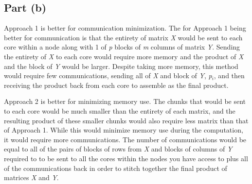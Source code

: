 \documentclass{article}\usepackage[]{graphicx}\usepackage[]{color}
\begin{document}
\subsection{Part (b)}
Approach 1 is better for communication minimization.  The for Approach 1 being better for communication is that the entirety of matrix \emph{X} would be sent to each core within a node along with 1 of \emph{p} blocks of \emph{m} columns of matrix \emph{Y}.  Sending the entirety of \emph{X} to each core would require more memory and the product of \emph{X} and the block of \emph{Y} would be larger.  Despite taking more memory, this method would require few communications, sending all of \emph{X} and block of \emph{Y}, \emph{p$_i$}, and then receiving the product back from each core to assemble as the final product.
\par Approach 2 is better for minimizing memory use.  The chunks that would be sent to each core would be much smaller than the entirety of each matrix, and the resulting product of these smaller chunks would also require less matrix than that of Approach 1.  While this would minimize memory use during the computation, it would require more communications.  The number of communications would be equal to all of the pairs of blocks of rows from \emph{X} and blocks of columns of \emph{Y} required to to be sent to all the cores within the nodes you have access to plus all of the communications back in order to stitch together the final product of matrices \emph{X} and \emph{Y}.  
\end{document}
